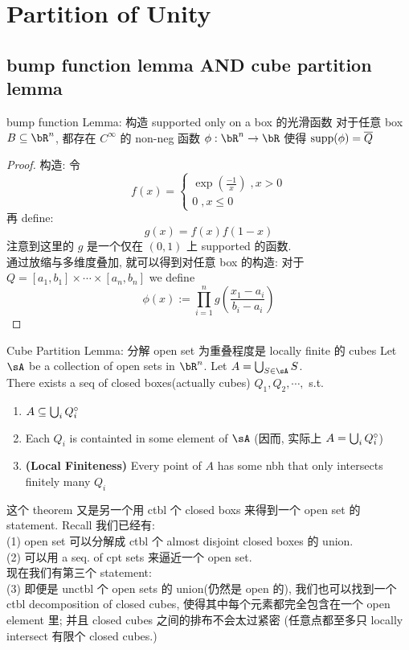 \documentclass[lang=cn,11pt]{elegantbook}
\begin{document}
\section{Partition of Unity}

\subsection{bump function lemma AND cube partition lemma}

\begin{lemma}{bump function Lemma: 构造 supported only on a box 的光滑函数}
    对于任意 box $B \sub \bR^n$, 都存在 $C^{\infty}$ 的 non-neg 函数 $\phi: \bR^n \rar \bR$ 使得 $\operatorname{supp}(\phi) = \overline{Q}$
\end{lemma}
\begin{proof}
    构造:
    令
    $$
    f(x) = 
    \begin{cases}
    \exp(\frac{-1}{x}) \; , x >0 \\
    0 \; , x \leq 0
    \end{cases}
    $$
    再 define:
    $$
    g(x) = f(x)f(1-x)
    $$
    注意到这里的 $g$ 是一个仅在 $(0,1)$ 上 supported 的函数.\\
    通过放缩与多维度叠加, 就可以得到对任意 box 的构造:
    对于 $Q = [a_1, b_1] \times \cdots \times [a_n, b_n]$ we define
    $$
    \phi(x) := \prod_{i = 1}^n g(\frac{x_1 - a_i}{b_i - a_i})
    $$
\end{proof}




\begin{lemma}{Cube Partition Lemma: 分解 open set 为重叠程度是 locally finite 的 cubes}
Let $\sA$ be a collection of open sets in $\bR^n$. Let $A  = \union_{S \in \sA} S$.\\
There exists a seq of closed boxes(actually cubes) $Q_1, Q_2, \cdots, $ s.t.
\begin{enumerate}
    \item $A \subseteq \bigcup_{i} Q_i ^{\circ}$
    \item Each $Q_i$ is containted in some element of $\sA$ (因而, 实际上 $A  = \bigcup_{i} Q_i ^{\circ}$)
    \item \textbf{(Local Finiteness)} Every point of $A$ has some nbh that only intersects finitely many $Q_i$
\end{enumerate}
\end{lemma}
\begin{remark}
这个 theorem 又是另一个用 ctbl 个 closed boxs 来得到一个 open set 的 statement. Recall 我们已经有:\\
(1) open set 可以分解成 ctbl 个 almost disjoint closed boxes 的 union.\\
(2) 可以用 a seq. of cpt sets 来逼近一个 open set.\\
现在我们有第三个 statement:\\
(3) 即便是 unctbl 个 open sets 的 union(仍然是 open 的), 我们也可以找到一个 ctbl decomposition of closed cubes, 使得其中每个元素都完全包含在一个 open element 里; 并且 closed cubes 之间的排布不会太过紧密 (任意点都至多只 locally intersect 有限个 closed cubes.)\\
\end{remark}
\end{document}
